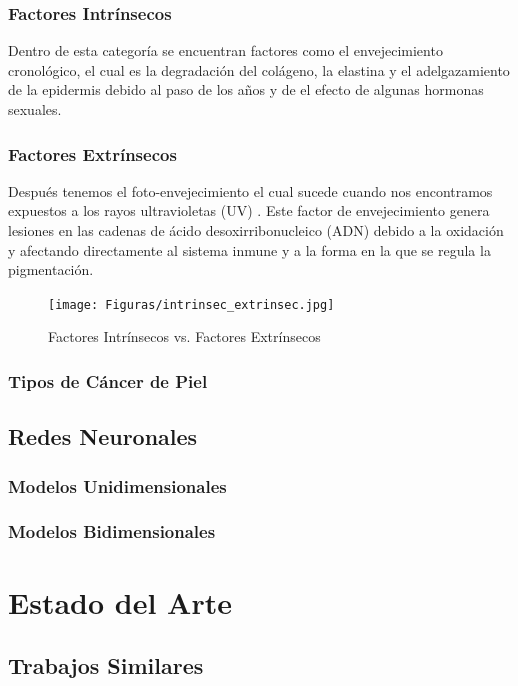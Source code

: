 \subsection{Factores Intrínsecos}
Dentro de esta categoría se encuentran factores como el envejecimiento cronológico, el cual es la degradación del colágeno, la elastina y el adelgazamiento de la epidermis debido al paso de los años y de el efecto de algunas hormonas sexuales.

\subsection{Factores Extrínsecos}
 Después tenemos el foto-envejecimiento el cual sucede cuando nos encontramos expuestos a los rayos ultravioletas (UV) \citep{skin_aging}. Este factor de envejecimiento genera lesiones en las cadenas de ácido desoxirribonucleico (ADN) debido a la oxidación y afectando directamente al sistema inmune y a la forma en la que se regula la pigmentación.

 \begin{figure}[h!]
    \texttt{[image: Figuras/intrinsec\_extrinsec.jpg]}
    \centering
    \caption{Factores Intrínsecos vs. Factores Extrínsecos \citep{skin_1}}
    \label{fig:in_ex}
\end{figure}

\subsection{Tipos de Cáncer de Piel}

\section{Redes Neuronales}
\subsection{Modelos Unidimensionales}
\subsection{Modelos Bidimensionales}

\chapter{Estado del Arte}
\section{Trabajos Similares}

